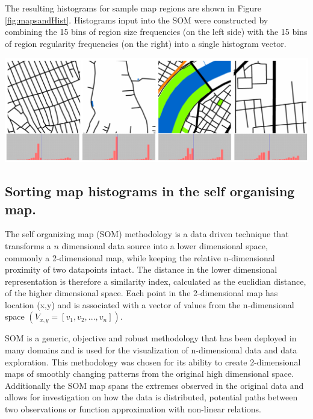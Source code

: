 \documentclass{nature}
\makeatletter
\renewenvironment*{figure}{\@float{figure}}{\end@float}
\makeatother
\begin{document}
\begin{methods}
The resulting histograms for sample map regions are shown in Figure \ref{fig:mapsandHist}. Histograms input into the SOM were constructed by combining the 15 bins of region size frequencies (on the left side) with the 15 bins of region regularity frequencies (on the right) into a single histogram vector.


\begin{figure}
    \centering    
\includegraphics[scale=0.55]{Images/HistSamples.png}  
\caption{\bf Four samples of map regions (top) and resulting histograms (bottom). Region size and regularity are joined into a combined histogram, with size frequencies on the left side of the graph and regularity on the right.}    
 \label{fig:mapsandHist}  
\end{figure} 

\subsection{Sorting map histograms in the self organising map.}\label{methodscluster}
The self organizing map (SOM) methodology\cite{Kohonen1982} is a data driven technique that transforms a $n$ dimensional data source into a lower dimensional space, commonly a 2-dimensional map, while keeping the relative n-dimensional proximity of two datapoints intact. The distance in the lower dimensional representation is therefore a similarity index, calculated as the euclidian distance, of the higher dimensional space. Each point in the 2-dimensional map has location (x,y) and is associated with a vector of values from the n-dimensional space $(V_{x,y} = [v_{1},v_{2},...,v_{n}])$.

SOM is a generic, objective and robust methodology that has been deployed in many domains and is used for the visualization of n-dimensional data and data exploration\cite{Koleheimen2004}. This methodology was chosen for its ability to create 2-dimensional maps of smoothly changing patterns from the original high dimensional space. Additionally the SOM map spans the extremes observed in the original data and allows for investigation on how the data is distributed, potential paths between two observations or function approximation with non-linear relations\cite{Barreto2006}. 


\end{methods}
\end{document}
